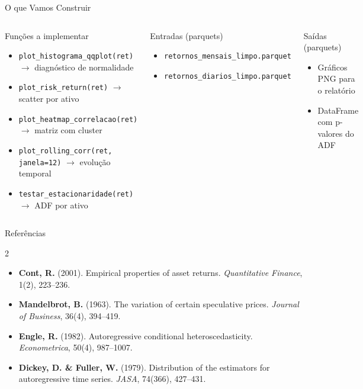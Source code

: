 \documentclass[aspectratio=169,12pt]{beamer}
\begin{document}
\begin{frame}[fragile]{O que Vamos Construir}
\begin{columns}[T]
\begin{block}{Funções a implementar}
\begin{itemize}
  \item \texttt{plot\_histograma\_qqplot(ret)} $\to$ diagnóstico de normalidade
  \item \texttt{plot\_risk\_return(ret)} $\to$ scatter por ativo
  \item \texttt{plot\_heatmap\_correlacao(ret)} $\to$ matriz com cluster
  \item \texttt{plot\_rolling\_corr(ret, janela=12)} $\to$ evolução temporal
  \item \texttt{testar\_estacionaridade(ret)} $\to$ ADF por ativo
\end{itemize}
\end{block}
\begin{block}{Entradas (parquets)}
\begin{itemize}
  \item \texttt{retornos\_mensais\_limpo.parquet}
  \item \texttt{retornos\_diarios\_limpo.parquet}
\end{itemize}
\end{block}
\vspace{.4em}
\begin{exampleblock}{Saídas (parquets)}
\begin{itemize}
  \item Gráficos PNG para o relatório
  \item DataFrame com p-valores do ADF
\end{itemize}
\end{exampleblock}
\end{columns}
\end{frame}

\begin{frame}[fragile]{Referências}
\begin{multicols}{2}
\tiny
\begin{itemize}
  \item \textbf{Cont, R.} (2001). Empirical properties of asset returns. \textit{Quantitative Finance}, 1(2), 223--236.
  \item \textbf{Mandelbrot, B.} (1963). The variation of certain speculative prices. \textit{Journal of Business}, 36(4), 394--419.
  \item \textbf{Engle, R.} (1982). Autoregressive conditional heteroscedasticity. \textit{Econometrica}, 50(4), 987--1007.
  \item \textbf{Dickey, D. \& Fuller, W.} (1979). Distribution of the estimators for autoregressive time series. \textit{JASA}, 74(366), 427--431.
\end{itemize}
\end{multicols}
\end{frame}
\end{document}
